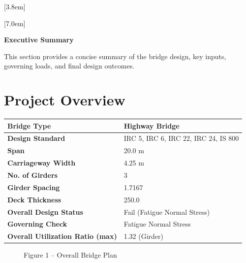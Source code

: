 \documentclass[12pt,a4paper]{report}
\numberwithin{table}{chapter}
\numberwithin{figure}{chapter}
\begin{document}
[3.8em]
  {\normalfont}
  {\contentslabel{2.3em}}
  {\hspace*{-2.3em}}
  {\hfill\contentspage}

[7.0em]
  {\normalfont}
  {\contentslabel{3.2em}}
  {\hspace*{-3.2em}}
  {\hfill\contentspage}

\newpage
\renewcommand{\contentsname}{\centering\Large\bfseries Table of Contents}
\tableofcontents


\newpage
{\centering\Large\bfseries Executive Summary\par}
\vspace{0.8em}

This section provides a concise summary of the bridge design, key inputs, governing loads, and final design outcomes.

\section*{Project Overview}
\label{sec:project-overview}


\begin{tabular}{|L{5.5cm}|L{8.5cm}|}
\hline
\textbf{Bridge Type} & Highway Bridge \\
\hline
\textbf{Design Standard} & IRC 5, IRC 6, IRC 22, IRC 24, IS 800 \\
\hline
\textbf{Span} & 20.0 m \\
\hline
\textbf{Carriageway Width} & 4.25 m \\
\hline
\textbf{No. of Girders} & 3 \\
\hline
\textbf{Girder Spacing} & 1.7167 \\
\hline
\textbf{Deck Thickness} & 250.0 \\
\hline
\textbf{Overall Design Status} & Fail (Fatigue Normal Stress) \\
\hline
\textbf{Governing Check} & Fatigue Normal Stress \\
\hline
\textbf{Overall Utilization Ratio (max)} & 1.32 (Girder) \\
\hline
\end{tabular}


\begin{figure}[H]
\centering
{}
\caption*{Figure 1 -- Overall Bridge Plan}
\end{figure}
\end{document}
